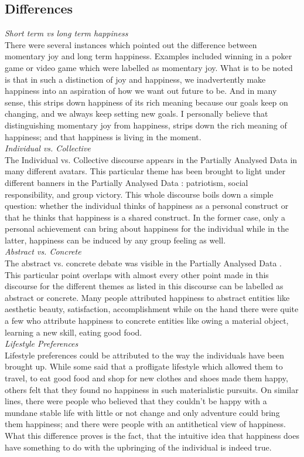 \documentclass[twoside]{article}
\newcommand{\pad}{Partially Analysed Data }
\begin{document}
\begin{multicols}{2}
\subsection{Differences}

\noindent \emph{Short term vs long term happiness}\\
There were several instances which pointed out the difference between momentary joy and long term happiness.
Examples included winning in a poker game or video game which were labelled as momentary joy. What is to be
noted is that in such a distinction of joy and happiness, we inadvertently make happiness into an
aspiration of how we want out future to be. And in many sense, this strips down happiness of its rich
meaning because our goals keep on changing, and we always keep setting new goals.
I personally believe that distinguishing momentary joy from happiness, strips down the rich meaning of
happiness; and that happiness is living in the moment. \\

\noindent \emph{Individual vs. Collective}\\
The Individual vs. Collective discourse appears in the \pad in many different avatars. This particular theme
has been brought to light under different banners in the \pad: patriotism, social responsibility, and group 
victory. This whole discourse boils down a simple question: whether the individual thinks of happiness as 
a personal construct or that he thinks that happiness is a shared construct. In the former case, only a personal
achievement can bring about happiness for the individual while in the latter, happiness can be induced by any
group feeling as well.\\

\noindent \emph{Abstract vs. Concrete}\\
The abstract vs. concrete debate was visible in the \pad. This particular point overlaps with almost every
other point made in this discourse for the different themes as listed in this discourse can be labelled as 
abstract or concrete. 
Many people attributed happiness to abstract entities like aesthetic beauty, satisfaction, accomplishment
while on the hand there were quite a few who attribute happiness to concrete entities like owing a material
object, learning a new skill, eating good food.\\

\noindent \emph{Lifestyle Preferences}\\
Lifestyle preferences could be attributed to the way the individuals have been brought up. While some said
that a profligate lifestyle which allowed them to travel, to eat good food and shop for new clothes and shoes
made them happy, others felt that they found no happiness in such materialistic pursuits.
On similar lines, there were people who believed that they couldn't be happy with a mundane stable life with 
little or not change and only adventure could bring them happiness; and there were people with an antithetical
view of happiness.
What this difference proves is the fact, that the intuitive idea that happiness does have something to do
with the upbringing of the individual is indeed true.


\end{multicols}
\end{document}
